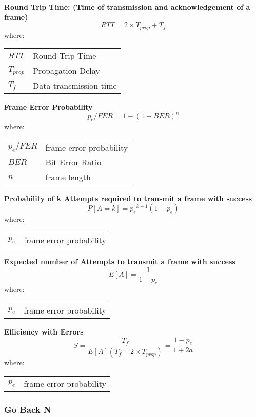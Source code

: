 \documentclass[../resumosRCOM.tex]{subfiles}
\makeatletter
\newenvironment{conditions}
  {\par\vspace{\abovedisplayskip}\noindent\begin{tabular}{>{$}l<{$} @{${}={}$} l}}
  {\end{tabular}\par\vspace{\belowdisplayskip}}
\makeatother
\begin{document}
\textbf{Round Trip Time: (Time of transmission and acknowledgement of a frame)} 
\begin{equation}
    {RTT}= 2 \times {T_{prop}} + {T_f}
\end{equation}
where:
\begin{conditions}
    RTT   &  Round Trip Time \\
   T_{prop}     &  Propagation Delay\\
   T_f &   Data transmission time
\end{conditions}

\textbf{Frame Error Probability} 
\begin{equation}
    {p_e/FER}= {1-(1- BER)^{n}} 
\end{equation}
where:
\begin{conditions}
    p_e/FER & frame error probability \\
    BER & Bit Error Ratio \\
    n & frame length

\end{conditions}

\textbf{Probability of k Attempts required to transmit a frame with success} 
\begin{equation}
    {P[A=k]}= {p_e}^{k-1} {(1-p_e)} 
\end{equation}
where:
\begin{conditions}
    p_e & frame error probability
\end{conditions}

\textbf{Expected number of Attempts to transmit a frame with success} 
\begin{equation}
    {E[A]}= \frac{1}{1-p_e} 
\end{equation}
where:
\begin{conditions}
    p_e & frame error probability
\end{conditions}

\textbf{Efficiency with Errors} 
\begin{equation}
    {S}= \frac{T_f}{E[A](T_f + 2 \times T_{prop})} = \frac{1-p_e}{1+2a}
\end{equation}
where:
\begin{conditions}
    p_e & frame error probability
\end{conditions}



\subsubsection{Go Back N}
\end{document}
